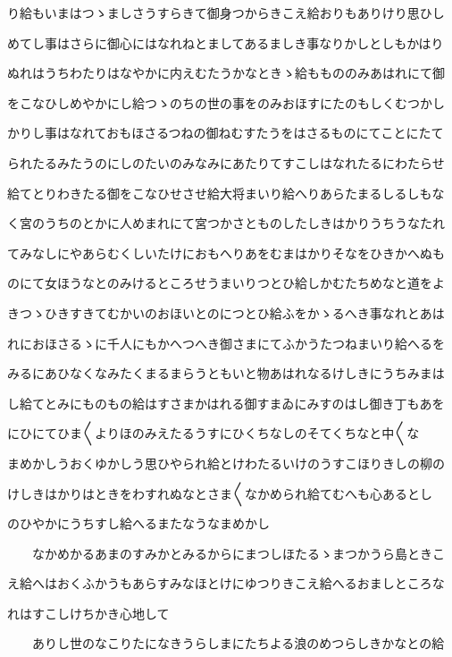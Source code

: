 \documentclass[a4paper,11pt,landscape]{ltjtarticle}
\begin{document}
\par\medskip
り給もいまはつゝましさうすらきて御身つからきこえ給おりもありけり思ひし
\par\medskip
めてし事はさらに御心にはなれねとましてあるましき事なりかしとしもかはり
\par\medskip
ぬれはうちわたりはなやかに内えむたうかなときゝ給ももののみあはれにて御
\par\medskip
をこなひしめやかにし給つゝのちの世の事をのみおほすにたのもしくむつかし
\par\medskip
かりし事はなれておもほさるつねの御ねむすたうをはさるものにてことにたて
\par\medskip
られたるみたうのにしのたいのみなみにあたりてすこしはなれたるにわたらせ
\par\medskip
給てとりわきたる御をこなひせさせ給大将まいり給へりあらたまるしるしもな
\par\medskip
く宮のうちのとかに人めまれにて宮つかさとものしたしきはかりうちうなたれ
\par\medskip
てみなしにやあらむくしいたけにおもへりあをむまはかりそなをひきかへぬも
\par\medskip
のにて女ほうなとのみけるところせうまいりつとひ給しかむたちめなと道をよ
\par\medskip
きつゝひきすきてむかいのおほいとのにつとひ給ふをかゝるへき事なれとあは
\par\medskip
れにおほさるゝに千人にもかへつへき御さまにてふかうたつねまいり給へるを
\par\medskip
みるにあひなくなみたくまるまらうともいと物あはれなるけしきにうちみまは
\par\medskip
し給てとみにものもの給はすさまかはれる御すまゐにみすのはし御き丁もあを
\par\medskip
にひにてひま〱よりほのみえたるうすにひくちなしのそてくちなと中〱な
\par\medskip
まめかしうおくゆかしう思ひやられ給とけわたるいけのうすこほりきしの柳の
\par\medskip
けしきはかりはときをわすれぬなとさま〱なかめられ給てむへも心あるとし
\par\medskip
のひやかにうちすし給へるまたなうなまめかし
\par\medskip
　　なかめかるあまのすみかとみるからにまつしほたるゝまつかうら島ときこ
\par\medskip
え給へはおくふかうもあらすみなほとけにゆつりきこえ給へるおましところな
\par\medskip
れはすこしけちかき心地して
\par\medskip
　　ありし世のなこりたになきうらしまにたちよる浪のめつらしきかなとの給
\end{document}
